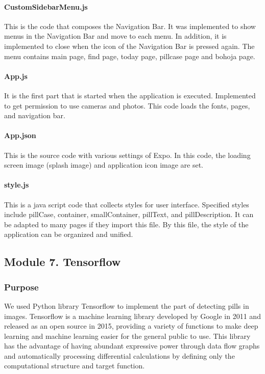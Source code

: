 \documentclass[conference]{IEEEtran}
\begin{document}
\paragraph{CustomSidebarMenu.js}
This is the code that composes the Navigation Bar. It was implemented to show menus in the Navigation Bar and move to each menu. In addition, it is implemented to close when the icon of the Navigation Bar is pressed again. The menu contains main page, find page, today page, pillcase page and bohoja page. \\

\paragraph{App.js}
It is the first part that is started when the application is executed. Implemented to get permission to use cameras and photos. This code loads the fonts, pages, and navigation bar.\\

\paragraph{App.json}
This is the source code with various settings of Expo. In this code, the loading screen image (splash image) and application icon image are set.\\

\paragraph{style.js}
This is a java script code that collects styles for user interface. Specified styles include pillCase, container, smallContainer, pillText, and pillDescription. It can be adapted to many pages if they import this file. By this file, the style of the application can be organized and unified.\\

\subsection{Module 7. Tensorflow}

\subsubsection{Purpose}
We used Python library Tensorflow to implement the part of detecting pills in images. Tensorflow is a machine learning library developed by Google in 2011 and released as an open source in 2015, providing a variety of functions to make deep learning and machine learning easier for the general public to use. This library has the advantage of having abundant expressive power through data flow graphs and automatically processing differential calculations by defining only the computational structure and target function.\\
\end{document}

